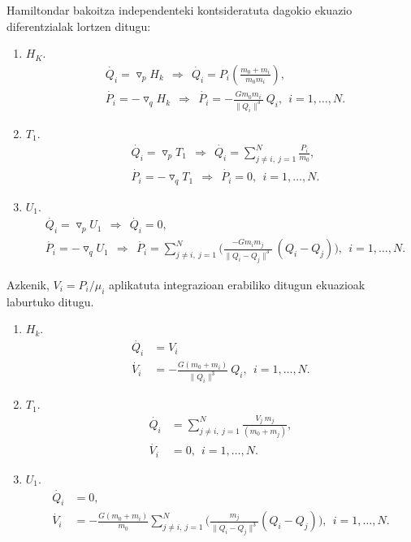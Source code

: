 Hamiltondar bakoitza independenteki kontsideratuta dagokio ekuazio diferentzialak lortzen ditugu:
\begin{enumerate}
\item $H_K$.
\begin{align*}
&\dot{Q_i} = \triangledown_p H_k \ \ \Rightarrow \ \  \dot{Q_i}=P_i\left(\frac{m_0+m_i}{m_0m_i}\right), \\
&\dot{P_i} = -\triangledown_q H_k \ \ \Rightarrow \ \  \dot{P_i}= - \frac{G m_0m_i}{\|Q_i\|^3 }\ Q_i, \ \ i=1,\dots, N.
\end{align*}

\item $T_1$.
\begin{align*}
&\dot{Q_i} = \triangledown_p T_1 \ \ \Rightarrow \ \  \dot{Q_i}=\sum\limits_{j\ne i,\ j=1}^{N} \frac{P_i}{m_0}, \\
&\dot{P_i} = -\triangledown_q T_1 \ \ \Rightarrow \ \  \dot{P_i}= 0, \ \ i=1,\dots, N.
\end{align*}

\item $U_1$.
\begin{align*}
&\dot{Q_i} = \triangledown_p U_1 \ \ \Rightarrow \ \  \dot{Q_i}=0, \\
&\dot{P_i} = -\triangledown_q U_1 \ \ \Rightarrow \ \ 
 \dot{P_i}= \sum\limits_{j \ne i , \ j=1}^{N} \bigg(\frac{-Gm_im_j}{\|Q_i-Q_j\|^3} \ (Q_i-Q_j) \bigg), \ \ i=1,\dots, N.
\end{align*}

\end{enumerate}

Azkenik, $V_i=P_i/\mu_i$ aplikatuta integrazioan erabiliko ditugun ekuazioak laburtuko ditugu.
\begin{enumerate}
\item $H_k$.
\begin{align*}
\dot{Q_i} &=V_i \\
\dot{V_i} &= - \frac{G(m_0+m_i)}{\|Q_i\|^3 }\ Q_i,  \ \ i=1,\dots, N.
\end{align*}

\item $T_1$.
\begin{align*}
\dot{Q_i} &=\sum\limits_{j\ne i,\ j=1}^{N} \frac{V_j \ m_j}{(m_0+m_j)}, \\ 
\dot{V_i} &= 0, \ \ i=1,\dots, N.
\end{align*}

\item $U_1$.
\begin{align*}
\dot{Q_i} &=0, \\ 
\dot{V_i} &= - \frac{G(m_0+m_i)}{m_0}
                    \sum\limits_{j \ne i , \ j=1}^{N} \bigg( \frac{m_j}{\|Q_i-Q_j\|^3} (Q_i-Q_j)     \bigg), \ \ i=1,\dots, N.
\end{align*}

\end{enumerate}

